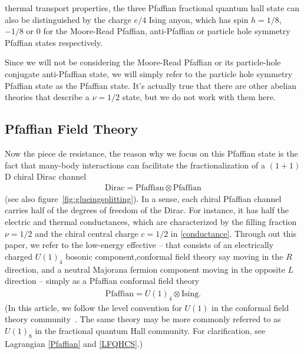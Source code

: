 thermal transport properties, the three Pfaffian fractional quantum hall state can also be distinguished by the charge $e/4$ Ising anyon, which has spin $h=1/8$, $-1/8$ or $0$ for the Moore-Read Pfaffian, anti-Pfaffian or particle hole symmetry Pfaffian states respectively. 

Since we will not be considering the Moore-Read Pfaffian or its particle-hole conjugate anti-Pfaffian state, we will simply refer to the particle hole symmetry Pfaffian state as the Pfaffian state. It's actually true that there are other abelian theories that describe a $\nu=1/2$ state, but we do not work with them here.

\subsection{Pfaffian Field Theory}
Now the piece de resistance, the reason why we focus on this Pfaffian state is the fact that many-body interactions can facilitate the fractionalization of a $(1+1)$D chiral Dirac channel \begin{align}\mathrm{Dirac}=\mathrm{Pfaffian}\otimes\mathrm{Pfaffian}\label{fractionalization}\end{align} (see also figure~\ref{fig:glueingsplitting}). In a sense, each chiral Pfaffian channel carries half of the degrees of freedom of the Dirac. For instance, it has half the electric and thermal conductances, which are characterized by the filling fraction $\nu=1/2$ and the chiral central charge $c=1/2$ in \eqref{conductance}. Through out this paper, we refer to the low-energy effective  -- that consists of an electrically charged $U(1)_4$ bosonic component,conformal field theory say moving in the $R$ direction, and a neutral Majorana fermion component moving in the opposite $L$ direction -- simply as a Pfaffian conformal field theory \begin{align}\mathrm{Pfaffian}=U(1)_4\otimes\overline{\mathrm{Ising}}.\label{PfaffianCFT}\end{align} (In this article, we follow the level convention for $U(1)$ in the conformal field theory community~\cite{bigyellowbook}. The same theory may be more commonly referred to as $U(1)_8$ in the fractional quantum Hall community. For clarification, see Lagrangian \eqref{Pfaffian} and \eqref{LFQHCS}.)

